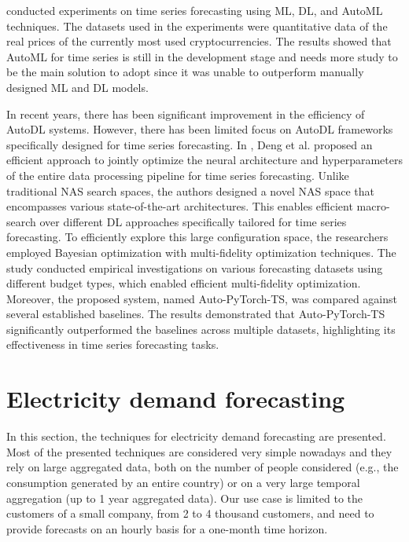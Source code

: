 \cite{su142215292} conducted experiments on time series forecasting using ML, DL, and AutoML techniques.
The datasets used in the experiments were quantitative data of the real prices of the currently most used cryptocurrencies.
The results showed that AutoML for time series is still in the development stage and needs more study to be the main solution to adopt since it was unable to outperform manually designed ML and DL models.

In recent years, there has been significant improvement in the efficiency of AutoDL systems.
However, there has been limited focus on AutoDL frameworks specifically designed for time series forecasting.
In \cite{Deng2022}, Deng et al. proposed an efficient approach to jointly optimize the neural architecture and hyperparameters of the entire data processing pipeline for time series forecasting.
Unlike traditional NAS search spaces, the authors designed a novel NAS space that encompasses various state-of-the-art architectures.
This enables efficient macro-search over different DL approaches specifically tailored for time series forecasting.
To efficiently explore this large configuration space, the researchers employed Bayesian optimization with multi-fidelity optimization techniques.
The study conducted empirical investigations on various forecasting datasets using different budget types, which enabled efficient multi-fidelity optimization.
Moreover, the proposed system, named Auto-PyTorch-TS, was compared against several established baselines.
The results demonstrated that Auto-PyTorch-TS significantly outperformed the baselines across multiple datasets, highlighting its effectiveness in time series forecasting tasks.


\section{Electricity demand forecasting}
\label{sec:demandsoa}
\vspace{0.2 cm}

In this section, the techniques for electricity demand forecasting are presented.
Most of the presented techniques are considered very simple nowadays and they rely on large aggregated data, both on the number of people considered (e.g., the consumption generated by an entire country) or on a very large temporal aggregation (up to 1 year aggregated data).
Our use case is limited to the customers of a small company, from 2 to 4 thousand customers, and need to provide forecasts on an hourly basis for a one-month time horizon.


